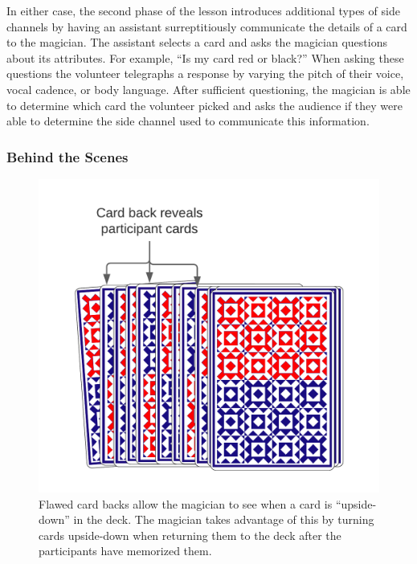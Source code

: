 In either case,  the second phase of the lesson
introduces additional types of side channels
by having an assistant
surreptitiously
communicate the details of a card
to the magician.
The assistant selects a card and asks the magician questions about its
attributes.
For example, ``Is my card red or black?''
When asking these questions the volunteer
telegraphs a response
by varying the pitch of their voice, vocal cadence, or body language.
After sufficient questioning, the magician is able to determine which card the
volunteer picked and asks the audience if they were able to determine the side
channel used to communicate this information.

\subsubsection{Behind the Scenes}

\begin{figure}[H]
\centering
\includegraphics[scale=.7]{images/Trick2}
\caption{Flawed card backs allow the magician to see when a card is
``upside-down'' in the deck.  The magician takes advantage of this by
  turning cards upside-down when returning
  them to the deck after the participants have memorized them.}
\label{fig:trick2}
\end{figure}

